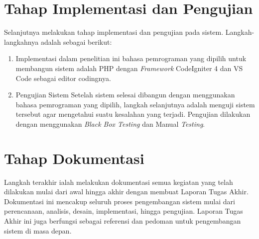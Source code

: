 \section{Tahap Implementasi dan Pengujian}
Selanjutnya melakukan tahap implementasi dan pengujian pada sistem. Langkah-langkahnya adalah sebagai berikut:
\begin{enumerate}
	\item Implementasi dalam penelitian ini bahasa pemrograman yang dipilih untuk membangun sistem adalah PHP dengan \textit{Framework} CodeIgniter 4 dan VS Code sebagai editor codingnya.
	\item Pengujian Sistem Setelah sistem selesai dibangun dengan menggunakan bahasa pemrograman yang dipilih, langkah selanjutnya adalah menguji sistem tersebut agar mengetahui suatu kesalahan yang terjadi. Pengujian dilakukan dengan menggunakan \textit{Black Box Testing} dan Manual \textit{Testing}.
\end{enumerate}

\section{Tahap Dokumentasi}
Langkah terakhir ialah melakukan dokumentasi semua kegiatan yang telah dilakukan mulai dari awal hingga akhir dengan membuat Laporan Tugas Akhir. Dokumentasi ini mencakup seluruh proses pengembangan sistem mulai dari perencanaan, analisis, desain, implementasi, hingga pengujian. Laporan Tugas Akhir ini juga berfungsi sebagai referensi dan pedoman untuk pengembangan sistem di masa depan.